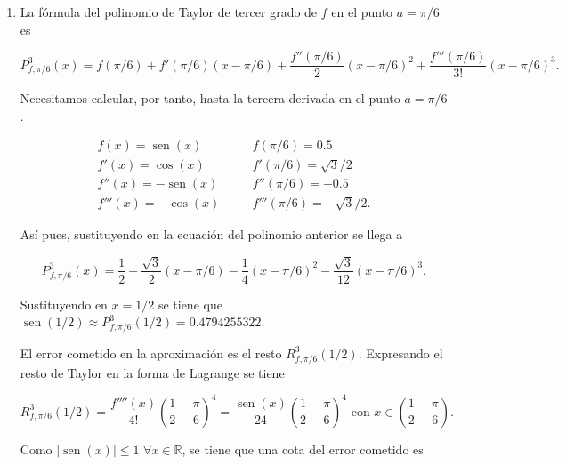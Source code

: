 \documentclass[
  spanish,
  a4paper,
]{scrreport}
\theoremstyle{definition}
\theoremstyle{remark}
\begin{document}
\begin{tcolorbox}[enhanced jigsaw, arc=.35mm, bottomrule=.15mm, bottomtitle=1mm, breakable, colback=white, colbacktitle=quarto-callout-tip-color!10!white, colframe=quarto-callout-tip-color-frame, coltitle=black, left=2mm, leftrule=.75mm, opacityback=0, opacitybacktitle=0.6, rightrule=.15mm, title=\textcolor{quarto-callout-tip-color}{\faLightbulb}\hspace{0.5em}{Solución}, titlerule=0mm, toprule=.15mm, toptitle=1mm]

\begin{enumerate}
\def\labelenumi{\alph{enumi}.}
\item
  La fórmula del polinomio de Taylor de tercer grado de \(f\) en el
  punto \(a=\pi/6\) es

  \[
   P^3_{f,\pi/6}(x) = f(\pi/6)+f'(\pi/6)(x-\pi/6)+ \frac{f''(\pi/6)}{2}(x-\pi/6)^2+\frac{f'''(\pi/6)}{3!}(x-\pi/6)^3.
   \]

  Necesitamos calcular, por tanto, hasta la tercera derivada en el punto
  \(a=\pi/6\).

  \[
   \begin{array}{lll}
   f(x) = \operatorname{sen}(x) &\quad &  f(\pi/6) = 0.5\\ 
   f'(x)=\cos(x) &\quad & f'(\pi/6) = \sqrt{3}/2\\ 
   f''(x) = -\operatorname{sen}(x) &\quad & f''(\pi/6) = -0.5\\ 
   f'''(x) = -\cos(x) &\quad & f'''(\pi/6) = -\sqrt{3}/2.
   \end{array}
   \]

  Así pues, sustituyendo en la ecuación del polinomio anterior se llega
  a

  \[
   P^3_{f,\pi/6}(x) = \frac{1}{2}+\frac{\sqrt{3}}{2}(x-\pi/6)-\frac{1}{4}(x-\pi/6)^2-\frac{\sqrt{3}}{12}(x-\pi/6)^3.
   \]

  Sustituyendo en \(x=1/2\) se tiene que
  \(\operatorname{sen}(1/2) \approx P^3_{f,\pi/6}(1/2) = 0.4794255322\).

  El error cometido en la aproximación es el resto
  \(R^3_{f,\pi/6}(1/2)\). Expresando el resto de Taylor en la forma de
  Lagrange se tiene

  \[
   R^3_{f,\pi/6}(1/2) = \frac{f''''(x)}{4!}\left(\frac{1}{2}-\frac{\pi}{6}\right)^4 = \frac{\operatorname{sen}(x)}{24}\left(\frac{1}{2}-\frac{\pi}{6}\right)^4 \mbox{ con }x\in\left(\frac{1}{2}-\frac{\pi}{6}\right).
   \]

  Como \(|\operatorname{sen}(x)|\leq 1\) \(\forall x\in \mathbb{R}\), se
  tiene que una cota del error cometido es


\end{enumerate}
\end{tcolorbox}
\end{document}
